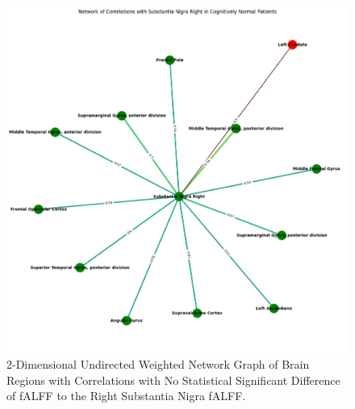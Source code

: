 \documentclass[12pt]{article}
\begin{document}
\begin{figure}[h]  %
    \centering
    \includegraphics[width=\textwidth]{"../img/statistically_significant_correlated_regions_sn_cogn_pdd_graph.png"}  %
    \caption{2-Dimensional Undirected Weighted Network Graph of Brain Regions with Correlations with No Statistical Significant Difference of fALFF to the Right Substantia Nigra fALFF.}
    \label{fig:2D}  %
\end{figure}
\end{document}
